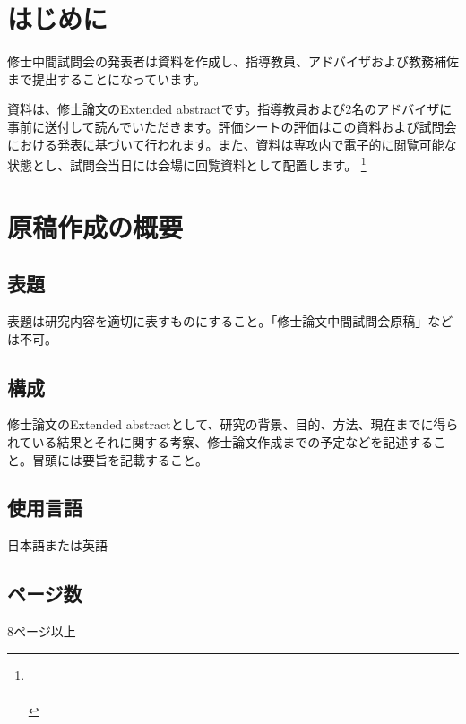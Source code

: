 \documentclass[fontsize=10.5bp]{jlreq}
\begin{document}

\section{はじめに}
修士中間試問会の発表者は資料を作成し、指導教員、アドバイザおよび教務補佐まで提出することになっています。

資料は、修士論文のExtended abstractです。指導教員および2名のアドバイザに事前に送付して読んでいただきます。評価シートの評価はこの資料および試問会における発表に基づいて行われます。また、資料は専攻内で電子的に閲覧可能な状態とし、試問会当日には会場に回覧資料として配置します。\renewcommand{\thefootnote}{\fnsymbol{footnote}}
\footnote[0]{
    {\normalsize
    \\
     \\
    }
}
\renewcommand{\thefootnote}{\arabic{footnote}}

\section{原稿作成の概要}
\subsection{表題}
表題は研究内容を適切に表すものにすること。「修士論文中間試問会原稿」などは不可。

\subsection{構成}
修士論文のExtended abstractとして、研究の背景、目的、方法、現在までに得られている結果とそれに関する考察、修士論文作成までの予定などを記述すること。冒頭には要旨を記載すること。

\subsection{使用言語}
日本語または英語

\subsection{ページ数}
8ページ以上
\end{document}
